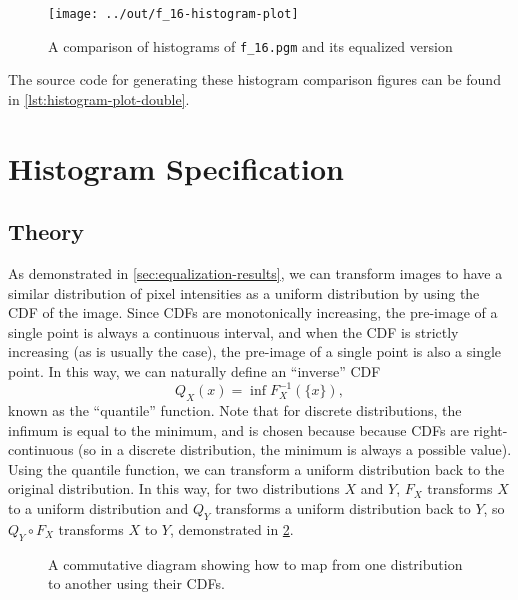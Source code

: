 \documentclass[headings=optiontoheadandtoc,listof=totoc,parskip=full]{scrartcl}
\begin{document}
\begin{figure}[H]
	\centering\texttt{[image: ../out/f\_16-histogram-plot]}
	\caption{A comparison of histograms of \texttt{f\_16.pgm} and its equalized version}
	\label{fig:equal-histogram-2}
\end{figure}

The source code for generating these histogram comparison figures can be found in \cref{lst:histogram-plot-double}.

\section{Histogram Specification}

\subsection{Theory}
As demonstrated in \cref{sec:equalization-results}, we can transform images to have a similar distribution of pixel intensities as a uniform distribution by using the CDF of the image. Since CDFs are monotonically increasing, the pre-image of a single point is always a continuous interval, and when the CDF is strictly increasing (as is usually the case), the pre-image of a single point is also a single point. In this way, we can naturally define an ``inverse'' CDF
\begin{equation}
	Q_X(x) = \inf F_X^{-1}(\{x\}), \label{eq:quantile-func}
\end{equation}
known as the ``quantile'' function. Note that for discrete distributions, the infimum is equal to the minimum, and is chosen because because CDFs are right-continuous (so in a discrete distribution, the minimum is always a possible value). Using the quantile function, we can transform a uniform distribution back to the original distribution. In this way, for two distributions $X$ and $Y$, $F_X$ transforms $X$ to a uniform distribution and $Q_Y$ transforms a uniform distribution back to $Y$, so $Q_Y \circ F_X$ transforms $X$ to $Y$, demonstrated in  \cref{fig:specification-cd}.

\begin{figure}[H]
	\centering
	\caption{A commutative diagram showing how to map from one distribution to another using their CDFs.}
	\label{fig:specification-cd}
\end{figure}
\end{document}
